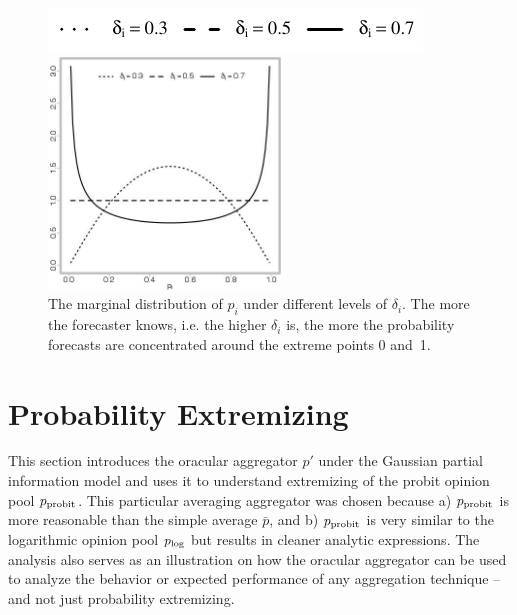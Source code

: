 \documentclass[11pt]{article}
\theoremstyle{definition}
\theoremstyle{definition}
\def\probit{p_{\rm probit}}
\def\plog{p_{\rm log}}
\begin{document}
\begin{figure}[t]
\centering
	\hspace{0em}\includegraphics{LegendMarginal}

 \includegraphics[width= 0.55\textwidth]{Marginals}
   \caption{The marginal distribution of $p_i$ under different levels of 
$\delta_i$.  The more the forecaster knows, i.e. the higher $\delta_i$ is, 
the more the probability forecasts are concentrated around the extreme 
points 0 and~1.}
\label{marginals}
\end{figure}

\section{Probability Extremizing}
\label{extremizing}
This section introduces the oracular aggregator $p'$ under the Gaussian partial information model and uses it to understand extremizing of the probit opinion pool $\probit$. This particular averaging aggregator was chosen because a) $\probit$ is more reasonable than the simple average $\bar{p}$, and b) $\probit$ is very similar to the logarithmic opinion pool $\plog$ but results in cleaner analytic expressions. The analysis also serves as an illustration on how the oracular aggregator can be used to analyze the behavior or expected performance of any aggregation technique -- and not just probability extremizing. 
\end{document}
